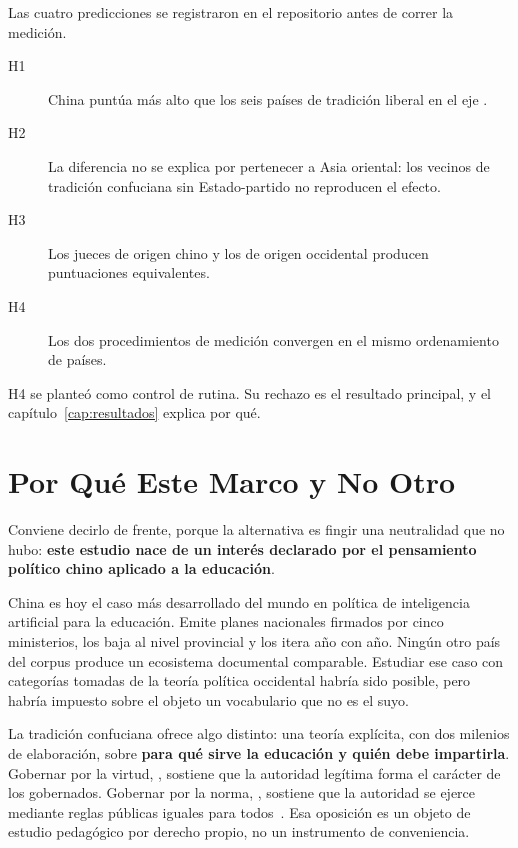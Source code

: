 Las cuatro predicciones se registraron en el repositorio antes de correr la medición.

\begin{description}
  \item[H1] China puntúa más alto que los seis países de tradición liberal en el eje \ejedf.
  \item[H2] La diferencia no se explica por pertenecer a Asia oriental: los vecinos de tradición confuciana sin Estado-partido no reproducen el efecto.
  \item[H3] Los jueces de origen chino y los de origen occidental producen puntuaciones equivalentes.
  \item[H4] Los dos procedimientos de medición convergen en el mismo ordenamiento de países.
\end{description}

H4 se planteó como control de rutina. Su rechazo es el resultado principal, y el capítulo~\ref{cap:resultados} explica por qué.


\section{Por Qué Este Marco y No Otro}
\label{sec:por-que-confuciano}

Conviene decirlo de frente, porque la alternativa es fingir una neutralidad que no hubo: \textbf{este estudio nace de un interés declarado por el pensamiento político chino aplicado a la educación}.

China es hoy el caso más desarrollado del mundo en política de inteligencia artificial para la educación. Emite planes nacionales firmados por cinco ministerios, los baja al nivel provincial y los itera año con año. Ningún otro país del corpus produce un ecosistema documental comparable. Estudiar ese caso con categorías tomadas de la teoría política occidental habría sido posible, pero habría impuesto sobre el objeto un vocabulario que no es el suyo.

La tradición confuciana ofrece algo distinto: una teoría explícita, con dos milenios de elaboración, sobre \textbf{para qué sirve la educación y quién debe impartirla}. Gobernar por la virtud, \dezhi, sostiene que la autoridad legítima forma el carácter de los gobernados. Gobernar por la norma, \fa, sostiene que la autoridad se ejerce mediante reglas públicas iguales para todos~\citep{pines2023legalism}. Esa oposición es un objeto de estudio pedagógico por derecho propio, no un instrumento de conveniencia.

